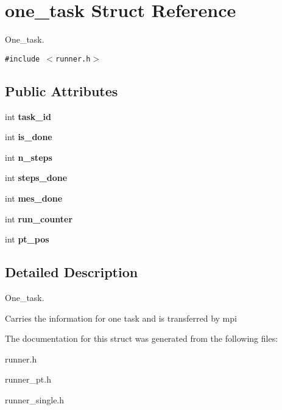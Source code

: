 \hypertarget{structone__task}{
\section{one\_\-task Struct Reference}
\label{structone__task}
}
One\_\-task.  


{\tt \#include $<$runner.h$>$}

\subsection*{Public Attributes}
\begin{CompactItemize}
\item 
\hypertarget{structone__task_0ae419d546c809be955c015ac4635ec2}{
int \textbf{task\_\-id}}
\label{structone__task_0ae419d546c809be955c015ac4635ec2}

\item 
\hypertarget{structone__task_88a4efcaf9c068f152769b88ea1a97f9}{
int \textbf{is\_\-done}}
\label{structone__task_88a4efcaf9c068f152769b88ea1a97f9}

\item 
\hypertarget{structone__task_14eb1bae5676c293f0fa5e55b0d75db5}{
int \textbf{n\_\-steps}}
\label{structone__task_14eb1bae5676c293f0fa5e55b0d75db5}

\item 
\hypertarget{structone__task_0f657bbf4ac06f5505b7f5012a517469}{
int \textbf{steps\_\-done}}
\label{structone__task_0f657bbf4ac06f5505b7f5012a517469}

\item 
\hypertarget{structone__task_7edec8c82d7024f19b135946497ee8d5}{
int \textbf{mes\_\-done}}
\label{structone__task_7edec8c82d7024f19b135946497ee8d5}

\item 
\hypertarget{structone__task_f26a1f21b9a0401911e6327c0479e235}{
int \textbf{run\_\-counter}}
\label{structone__task_f26a1f21b9a0401911e6327c0479e235}

\item 
\hypertarget{structone__task_cc1c04ce8a9d8097095eb5ddf321a3e6}{
int \textbf{pt\_\-pos}}
\label{structone__task_cc1c04ce8a9d8097095eb5ddf321a3e6}

\end{CompactItemize}


\subsection{Detailed Description}
One\_\-task. 

Carries the information for one task and is transferred by mpi 

The documentation for this struct was generated from the following files:\begin{CompactItemize}
\item 
runner.h\item 
runner\_\-pt.h\item 
runner\_\-single.h\end{CompactItemize}

